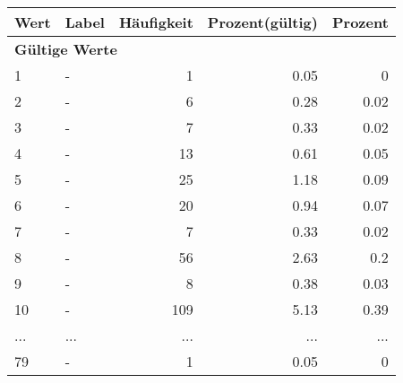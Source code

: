      \begin{longtable}{lXrrr}
     \toprule
     \textbf{Wert} & \textbf{Label} & \textbf{Häufigkeit} & \textbf{Prozent(gültig)} & \textbf{Prozent} \\
     \endhead
     \midrule
     \multicolumn{5}{l}{\textbf{Gültige Werte}}\\
        1 & \multicolumn{1}{X}{-} & %
          \num{1} &
          \num[round-mode=places,round-precision=2]{0,05} &
          \num[round-mode=places,round-precision=2]{0} \\
        2 & \multicolumn{1}{X}{-} & %
          \num{6} &
          \num[round-mode=places,round-precision=2]{0,28} &
          \num[round-mode=places,round-precision=2]{0,02} \\
        3 & \multicolumn{1}{X}{-} & %
          \num{7} &
          \num[round-mode=places,round-precision=2]{0,33} &
          \num[round-mode=places,round-precision=2]{0,02} \\
        4 & \multicolumn{1}{X}{-} & %
          \num{13} &
          \num[round-mode=places,round-precision=2]{0,61} &
          \num[round-mode=places,round-precision=2]{0,05} \\
        5 & \multicolumn{1}{X}{-} & %
          \num{25} &
          \num[round-mode=places,round-precision=2]{1,18} &
          \num[round-mode=places,round-precision=2]{0,09} \\
        6 & \multicolumn{1}{X}{-} & %
          \num{20} &
          \num[round-mode=places,round-precision=2]{0,94} &
          \num[round-mode=places,round-precision=2]{0,07} \\
        7 & \multicolumn{1}{X}{-} & %
          \num{7} &
          \num[round-mode=places,round-precision=2]{0,33} &
          \num[round-mode=places,round-precision=2]{0,02} \\
        8 & \multicolumn{1}{X}{-} & %
          \num{56} &
          \num[round-mode=places,round-precision=2]{2,63} &
          \num[round-mode=places,round-precision=2]{0,2} \\
        9 & \multicolumn{1}{X}{-} & %
          \num{8} &
          \num[round-mode=places,round-precision=2]{0,38} &
          \num[round-mode=places,round-precision=2]{0,03} \\
        10 & \multicolumn{1}{X}{-} & %
          \num{109} &
          \num[round-mode=places,round-precision=2]{5,13} &
          \num[round-mode=places,round-precision=2]{0,39} \\
       ... & ... & ... & ... & ... \\
        79 & \multicolumn{1}{X}{-} & %
          \num{1} &
          \num[round-mode=places,round-precision=2]{0,05} &
          \num[round-mode=places,round-precision=2]{0} \\


\end{longtable}

